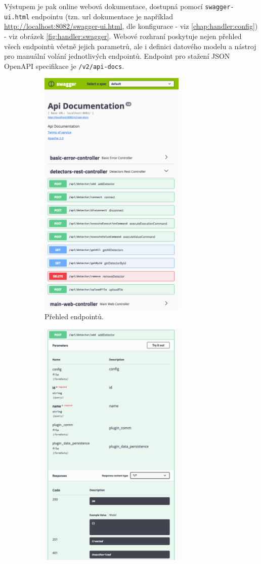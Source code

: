 Výstupem je pak online webová dokumentace, dostupná pomocí \texttt{swagger-ui.html} endpointu (tzn. url dokumentace je například \url{http://localhost:8082/swagger-ui.html}, dle konfigurace - viz \ref{chap:handler:config}) - viz obrázek \ref{fig:handler:swagger}. Webové rozhraní poskytuje nejen přehled všech endpointů včetně jejich parametrů, ale i definici datového modelu a nástroj pro manuální volání jednotlivých endpointů.
Endpoint pro stažení JSON OpenAPI specifikace je \texttt{/v2/api-docs}.

\begin{figure}[h]
	\begin{center}
    \begin{subfigure}{7.0cm}
			\includegraphics[width=7.0cm]{figures/handler_swagger_a.png}	
			\caption{Přehled endpointů.}
			\label{fig:handler:swagger_b}
		\end{subfigure}
		\hspace{0.1cm}
		\begin{subfigure}{7.0cm}
			\includegraphics[width=7.0cm]{figures/handler_swagger_b.png}

\end{subfigure}
\end{center}
\end{figure}
